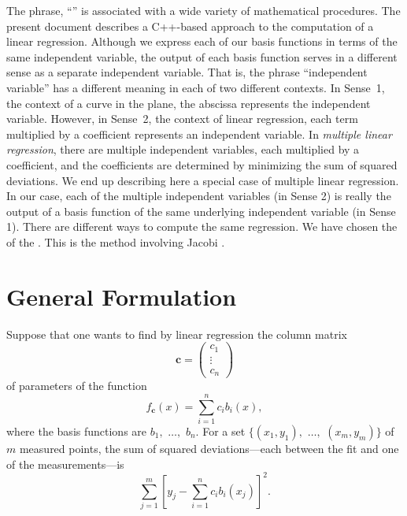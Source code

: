 \documentclass[twocolumn]{article}
\begin{document}
The phrase, ``'' is associated
with a wide variety of mathematical procedures. The present document describes
a C++-based approach to the computation of a linear regression.  Although we
express each of our basis functions in terms of the same independent variable,
the output of each basis function serves in a different sense as a separate
independent variable. That is, the phrase ``independent variable'' has a
different meaning in each of two different contexts. In Sense~1, the context of
a curve in the plane, the abscissa represents the independent variable.
However, in Sense~2, the context of linear regression, each term multiplied by
a coefficient represents an independent variable. In \emph{multiple linear
regression}, there are multiple independent variables, each multiplied by a
coefficient, and the coefficients are determined by minimizing the sum of
squared deviations.  We end up describing here a special case of multiple
linear regression. In our case, each of the multiple independent variables (in
Sense 2) is really the output of a basis function of the same underlying
independent variable (in Sense 1).  There are different ways to compute the
same regression. We have chosen the 
of the .  This is the
method involving Jacobi .

\section{General Formulation}

Suppose that one wants to find by linear regression the column matrix
\begin{equation}
   \mathbf{c} =
   \begin{pmatrix}
      c_1\\
      \vdots\\
      c_n
   \end{pmatrix}
\end{equation}
of parameters of the function
\begin{equation}
   f_{\mathbf{c}}(x) = \sum_{i=1}^{n} c_i b_i(x),
\end{equation}
where the basis functions are $b_1,$ $\ldots,$ $b_n$. For a set $\{(x_1,y_1),$
$\ldots,$ $(x_m,y_m)\}$ of $m$ measured points, the sum of squared
deviations---each between the fit and one of the measurements---is
\begin{equation}
   \sum_{j=1}^{m} \left[ y_j - \sum_{i=1}^{n} c_i b_i(x_j) \right]^2.
\end{equation}
\end{document}
